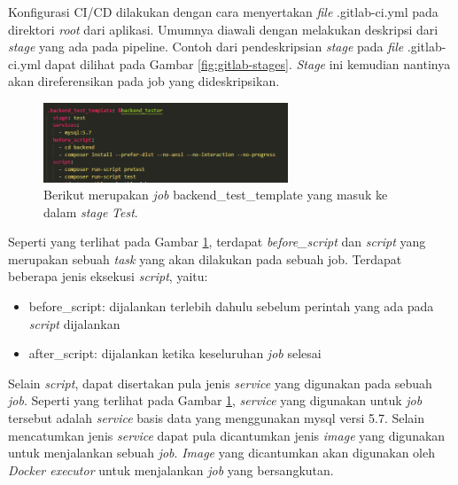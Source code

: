 \documentclass[a4paper,twoside]{article}
\begin{document}
\begin{enumerate}
\begin{itemize}
\begin{itemize}
                 Konfigurasi CI/CD dilakukan dengan cara menyertakan \textit{file} .gitlab-ci.yml pada direktori \textit{root} dari aplikasi. Umumnya diawali dengan melakukan deskripsi dari \textit{stage} yang ada pada pipeline. Contoh dari pendeskripsian \textit{stage} pada \textit{file}  .gitlab-ci.yml dapat dilihat pada Gambar \ref{fig:gitlab-stages}. \textit{Stage} ini kemudian nantinya akan direferensikan pada job yang dideskripsikan. 
                 
                 
                 	\begin{figure}[H]
                    \centering
                    \includegraphics[width=0.65\textwidth]{images/gitlab-job-test-backend-temp.PNG}
                    \caption{Berikut merupakan \textit{job} backend\_test\_template yang masuk ke dalam \textit{stage} \textit{Test}.}
                    \label{fig:gitlab-job-test-backend-temp}
                \end{figure}
        		
                 Seperti yang terlihat pada Gambar \ref{fig:gitlab-job-test-backend-temp}, terdapat \textit{before\_script} dan \textit{script} yang merupakan sebuah \textit{task} yang akan dilakukan pada sebuah job. Terdapat beberapa jenis eksekusi \textit{script}, yaitu:
                 \begin{itemize}
                     \item before\_script: dijalankan terlebih dahulu sebelum perintah yang ada pada \textit{script} dijalankan
                     \item after\_script: dijalankan ketika keseluruhan \textit{job} selesai 
                 \end{itemize}
                 
                 Selain \textit{script}, dapat disertakan pula jenis \textit{service} yang digunakan pada sebuah \textit{job}. Seperti yang terlihat pada Gambar \ref{fig:gitlab-job-test-backend-temp}, \textit{service} yang digunakan untuk \textit{job} tersebut adalah \textit{service} basis data yang menggunakan mysql versi 5.7. Selain mencatumkan jenis \textit{service} dapat pula dicantumkan jenis \textit{image} yang digunakan untuk menjalankan sebuah \textit{job}. \textit{Image} yang dicantumkan akan digunakan oleh \textit{Docker executor} untuk menjalankan \textit{job} yang bersangkutan.
                 

\end{itemize}
\end{itemize}
\end{enumerate}
\end{document}
